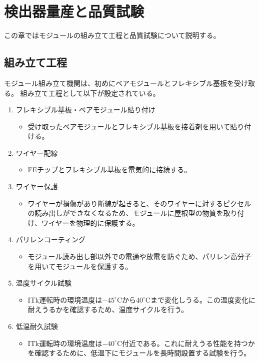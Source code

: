 \chapter{検出器量産と品質試験}
この章ではモジュールの組み立て工程と品質試験について説明する。

\section{組み立て工程}\label{sec:assembly}
モジュール組み立て機関は、初めにベアモジュールとフレキシブル基板を受け取る。
組み立て工程として以下が設定されている。
\begin{enumerate}
  \item フレキシブル基板・ベアモジュール貼り付け
  \begin{itemize}
    \item 受け取ったベアモジュールとフレキシブル基板を接着剤を用いて貼り付ける。
  \end{itemize}
  \item ワイヤー配線
  \begin{itemize}
    \item FEチップとフレキシブル基板を電気的に接続する。
  \end{itemize}
  \item ワイヤー保護
  \begin{itemize}
    \item ワイヤーが損傷があり断線が起きると、そのワイヤーに対するピクセルの読み出しができなくなるため、モジュールに屋根型の物質を取り付け、ワイヤーを物理的に保護する。
  \end{itemize}
  \item パリレンコーティング
  \begin{itemize}
    \item モジュール読み出し部以外での電通や放電を防ぐため、パリレン高分子を用いてモジュールを保護する。
  \end{itemize}
  \item 温度サイクル試験
  \begin{itemize}
    \item ITk運転時の環境温度は$-45^\circ$Cから$40^\circ$Cまで変化しうる\cite{3-2}。この温度変化に耐えうるかを確認するため、温度サイクルを行う。
  \end{itemize}
  \item 低温耐久試験
  \begin{itemize}
    \item ITk運転時の環境温度は$-40^\circ$C付近である。これに耐えうる性能を持つかを確認するために、低温下にモジュールを長時間設置する試験を行う。
  \end{itemize}
\end{enumerate}

